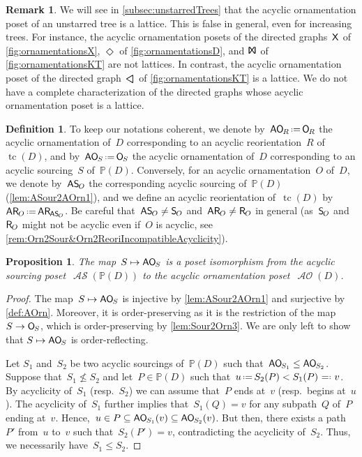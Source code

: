 \documentclass{amsart}
\newtheorem{proposition}[theorem]{Proposition}
\theoremstyle{definition}
\newtheorem{definition}[theorem]{Definition}
\newtheorem{remark}[theorem]{Remark}
\renewcommand{\c}[1]{\mathcal{#1}} %
\newcommand{\eqdef}{\mbox{\,\raisebox{0.2ex}{\scriptsize\ensuremath{\mathrm:}}\ensuremath{=}\,}} %
\newcommand{\defeq}{\mbox{~\ensuremath{=}\raisebox{0.2ex}{\scriptsize\ensuremath{\mathrm:}} }} %
\DeclareMathOperator{\tc}{tc} %
\newcommand{\mymap}[2]{\mathsf{#1}_{\hspace{-.7pt}#2}}
\newcommand{\orn}[1]{\mymap{O}{#1}}  %
\DeclareMathOperator{\AOrn}{\c{AO}}  %
\newcommand{\aorn}[1]{\mymap{AO}{#1}}  %
\newcommand{\reori}[1]{\mymap{R}{#1}}  %
\newcommand{\areori}[1]{\mymap{AR}{#1}}  %
\newcommand{\sour}[1]{\mymap{S}{#1}}  %
\DeclareMathOperator{\ASour}{\mathcal{AS}}  %
\newcommand{\asour}[1]{\mymap{AS}{#1}}  %
\newcommand{\PP}{\mathbb P} %
\newcommand{\Xgraph}{\sf X} %
\newcommand{\Tgraph}{\sf I\!X\!I} %
\newcommand{\Dgraph}{\boldsymbol{\Diamond}} %
\newcommand{\Kgraph}{\rotatebox[origin=c]{90}{$\boldsymbol{\triangle}$}} %
\begin{document}
\begin{remark}
\label{rem:AOrnLat}
We will see in \cref{subsec:unstarredTrees} that the acyclic ornamentation poset of an unstarred tree  is a lattice.
This is false in general, even for increasing trees.
For instance, the acyclic ornamentation posets of the directed graphs~$\Xgraph$ of \cref{fig:ornamentationsX}, $\Dgraph$ of \cref{fig:ornamentationsD}, and $\Tgraph$ of \cref{fig:ornamentationsKT} are not lattices.
In contrast, the acyclic ornamentation poset of the directed graph~$\Kgraph$ of \cref{fig:ornamentationsKT} is a lattice.
We do not have a complete characterization of the directed graphs whose acyclic ornamentation poset is a lattice.
\end{remark}

\begin{definition}
\label{def:moreNotations}
To keep our notations coherent, we denote by~$\aorn{R} \eqdef \orn{R}$ the acyclic ornamentation of~$D$ corresponding to an acyclic reorientation~$R$ of~$\tc(D)$, and by~$\aorn{S} \eqdef \orn{S}$ the acyclic ornamentation of~$D$ corresponding to an acyclic sourcing~$S$ of~$\PP(D)$.
Conversely, for an acyclic ornamentation~$O$ of~$D$, we denote by~$\asour{O}$ the corresponding acyclic sourcing of~$\PP(D)$ (\cref{lem:ASour2AOrn1}), and we define an acyclic reorientation of~$\tc(D)$ by~$\areori{O} \eqdef \areori{\asour{O}}$.
Be careful that~$\asour{O} \ne \sour{O}$ and~$\areori{O} \ne \reori{O}$ in general (as~$\sour{O}$ and~$\reori{O}$ might not be acyclic even if~$O$ is acyclic, see \cref{rem:Orn2Sour&Orn2ReoriIncompatibleAcyclicity}).
\end{definition}

\begin{proposition}
\label{prop:ASour2AOrn}
The map~$S \mapsto \aorn{S}$ is a poset isomorphism from the acyclic sourcing \linebreak poset~$\ASour(\PP(D))$ to the acyclic ornamentation poset~$\AOrn(D)$.
\end{proposition}

\begin{proof}
The map~$S \mapsto \aorn{S}$ is injective by \cref{lem:ASour2AOrn1} and surjective by \cref{def:AOrn}.
Moreover, it is order-preserving as it is the restriction of the map $S \to \orn{S}$, which is order-preserving by \cref{lem:Sour2Orn3}.
We are only left to show that $S \mapsto \aorn{S}$ is order-reflecting.

Let $S_1$ and~$S_2$ be two acyclic sourcings of~$\PP(D)$ such that~$\aorn{S_1} \leq \aorn{S_2}$.
Suppose that~$S_1 \not\leq S_2$ and let~$P \in \PP(D)$ such that~$u \eqdef S_2(P) < S_1(P) \defeq v$.
By acyclicity of~$S_1$ (resp.~$S_2$) we can assume that~$P$ ends at~$v$ (resp.~begins at~$u$).
The acyclicity of~$S_1$ further implies that~$S_1(Q) = v$ for any subpath~$Q$ of~$P$ ending at~$v$.
Hence,~$u \in P \subseteq \aorn{S_1}(v) \subseteq \aorn{S_2}(v)$.
But then, there exists a path~$P'$ from~$u$ to~$v$ such that~$S_2(P') = v$, contradicting the acyclicity of~$S_2$.
Thus, we necessarily have~$S_1 \leq S_2$.
\end{proof}
\end{document}
